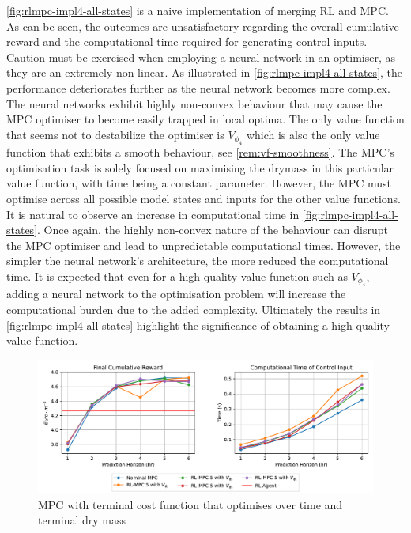 \autoref{fig:rlmpc-impl4-all-states} is a naive implementation of merging RL and MPC. As can be seen, the outcomes are unsatisfactory regarding the overall cumulative reward and the computational time required for generating control inputs. Caution must be exercised when employing a neural network in an optimiser, as they are an extremely non-linear. As illustrated in \autoref{fig:rlmpc-impl4-all-states}, the performance deteriorates further as the neural network becomes more complex. The neural networks exhibit highly non-convex behaviour that may cause the MPC optimiser to become easily trapped in local optima. The only value function that seems not to destabilize the optimiser is ${V}_{\phi_4}$ which is also the only value function that exhibits a smooth behaviour, see \cref{rem:vf-smoothness}. The MPC's optimisation task is solely focused on maximising the drymass in this particular value function, with time being a constant parameter. However, the MPC must optimise across all possible model states and inputs for the other value functions. \\
It is natural to observe an increase in computational time in \autoref{fig:rlmpc-impl4-all-states}. Once again, the highly non-convex nature of the behaviour can disrupt the MPC optimiser and lead to unpredictable computational times. However, the simpler the neural network's architecture, the more reduced the computational time. It is expected that even for a high quality value function such as $V_{\phi_4}$, adding a neural network to the optimisation problem will increase the computational burden due to the added complexity. Ultimately the results in \autoref{fig:rlmpc-impl4-all-states} highlight the significance of obtaining a high-quality value function.

\begin{figure}[H]
	\centering
	\includegraphics[width=\textwidth]{figures/rl_mpc_impl_4_1.pdf}
	\caption{MPC with terminal cost function that optimises over time and terminal dry mass}
	\label{fig:rlmpc-impl4-only-drymass}
\end{figure}

